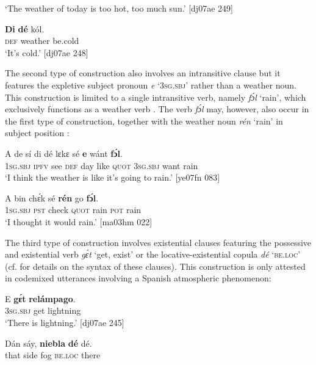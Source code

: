 \glt ‘The weather of today is too hot, too much sun.’ [dj07ae 249]
\z


\ea%
    \label{ex:key:1244}
    \gll \textbf{Di}  \textbf{dé}    kól.\\
\textsc{def}  weather  be.cold\\

\glt ‘It’s cold.’ [dj07ae 248]
\z

The second type of construction also involves an intransitive clause but it features the expletive subject pronoun \textit{e} ‘\textsc{3sg.sbj}’ rather than a weather noun. This construction is limited to a single intransitive verb, namely \textit{fɔ́l} ‘rain’, which exclusively functions as a weather verb . The verb \textit{fɔ́l} may, however, also occur in the first type of construction, together with the weather noun \textit{rén} ‘rain’ in subject position :


\ea%
    \label{ex:key:1245}
    \gll A    de  sí  di  dé  lɛkɛ  sé    \textbf{e}    wánt  \textbf{fɔ́l}.\\
\textsc{1sg.sbj}  \textsc{ipfv}  see  \textsc{def}  day  like  \textsc{quot}    \textsc{3sg.sbj}  want  rain\\

\glt ‘I think the weather is like it’s going to rain.’ [ye07fn 083]
\z


\ea%
    \label{ex:key:1246}
    \gll A    bin  chɛ́k  sé    \textbf{rén}  go  \textbf{fɔ́l}.\\
\textsc{1sg.sbj}  \textsc{pst}  check  \textsc{quot}    rain  \textsc{pot}  rain\\

\glt ‘I thought it would rain.’ [ma03hm 022]
\z

The third type of construction involves existential clauses featuring the possessive and existential verb \textit{gɛ́t} ‘get, exist’ or the locative-existential copula \textit{dé} ‘\textsc{be.loc}’ (cf.  for details on the syntax of these clauses). This construction is only attested in codemixed utterances involving a Spanish atmospheric phenomenon: 


\ea%
    \label{ex:key:1247}
    \gll E    \textbf{gɛ́t}  \textbf{relámpago}.\\
\textsc{3sg.sbj}  get  lightning\\

\glt ‘There is lightning.’ [dj07ae 245]
\z


\ea%
    \label{ex:key:1248}
    \gll Dán  sáy,  \textbf{niebla}  \textbf{dé}    dé.\\
that  side  fog    \textsc{be.loc}  there\\

